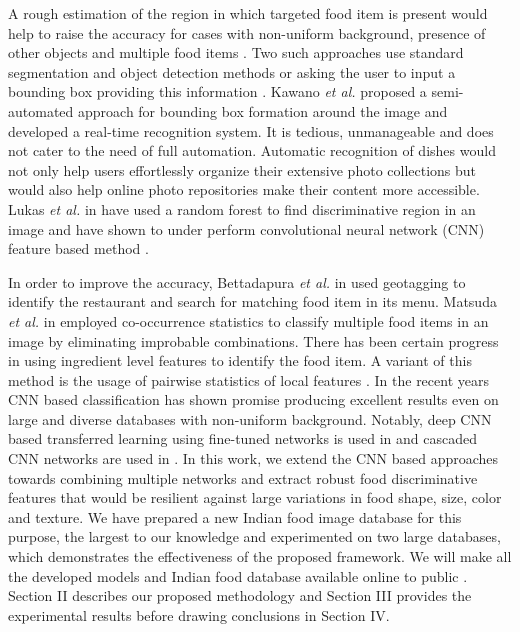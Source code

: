 \documentclass[journal]{IEEEtran}%
\begin{document}
A rough estimation of the region in which targeted food item is present would help to raise the accuracy for cases with non-uniform background, presence of other objects and multiple food items \cite{Liu13}. Two such approaches use standard segmentation and object detection methods \cite{Bola1} or asking the user to input a bounding box providing this information \cite{Kawano1}. Kawano \emph{et al.} \cite{Kawano1,Yanai1} proposed a semi-automated approach for bounding box formation around the image and developed a real-time recognition system. It is tedious, unmanageable and does not cater to the need of full automation. Automatic recognition of dishes would not only help users effortlessly organize their extensive photo collections but would also help online photo repositories make their content more accessible. Lukas \emph{et al.} in \cite{Bossard1} have used a random forest to find discriminative region in an image and have shown to under perform convolutional neural network (CNN) feature based method \cite{Krizhevsky1}.

In order to improve the accuracy, Bettadapura \emph{et al.} in \cite{Bettadapura1} used geotagging to identify the restaurant and search for matching food item in its menu. Matsuda \emph{et al.} in \cite{Matsuda1} employed co-occurrence statistics to classify multiple food items in an image by eliminating improbable combinations. There has been certain progress in using ingredient level features \cite{Wang6,Chen5,baxterfood} to identify the food item. A variant of this method is the usage of pairwise statistics of local features \cite{Shulin1}. In the recent years CNN based classification has shown promise producing excellent results even on large and diverse databases with non-uniform background. Notably, deep CNN based transferred learning using fine-tuned networks is used in \cite{Sibo1,Zhang2,Park2,Ana1,Gan2} and cascaded CNN networks are used in \cite{Zhang3}. In this work, we extend the CNN based approaches towards combining multiple networks and extract robust food discriminative features that would be resilient against large variations in food shape, size, color and texture. We have prepared a new Indian food image database for this purpose, the largest to our knowledge and experimented on two large databases, which demonstrates the effectiveness of the proposed framework. We will make all the developed models and Indian food database available online to public \cite{Mandal15}. Section II describes our proposed methodology and Section III provides the experimental results before drawing conclusions in Section IV.
\end{document}
